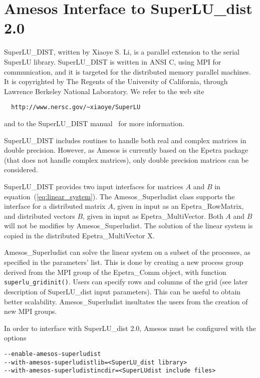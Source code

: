 \documentclass[11pt]{SANDreport}
\begin{document}

\section{Amesos Interface to SuperLU\_dist 2.0}
\label{sec:superludist}

SuperLU\_DIST, written by Xiaoye S. Li, is a parallel extension to the
serial SuperLU library.  SuperLU\_DIST is written in ANSI C, using MPI
for communication, and it is targeted for the distributed memory
parallel machines. It is copyrighted by The Regents of the University of
California, through Lawrence Berkeley National Laboratory.  We refer to
the web site
\begin{verbatim}
  http://www.nersc.gov/~xiaoye/SuperLU
\end{verbatim}
and to the SuperLU\_DIST manual~\cite{superlu-manual} for more
information.

SuperLU\_DIST includes routines to handle both real and complex matrices
in double precision. However, as Amesos is currently based on the Epetra
package (that does not handle complex matrices), only double precision
matrices can be considered.

SuperLU\_DIST provides two input interfaces for matrices $A$ and $B$ in
equation~(\ref{eq:linear_system}). The Amesos\_Superludist class
supports the interface for a distributed matrix $A$, given in input as
an Epetra\_RowMatrix, and distributed vectors $B$, given in input as
Epetra\_MultiVector. Both $A$ and $B$ will not be modifies by
Amesos\_Superludist. The solution of the linear system is copied in the
distributed Epetra\_MultiVector X.

Amesos\_Superludist can solve the linear system on a subset of the
processes, as specified in the parameters' list. This is done by
creating a new process group derived from the MPI group of the
Epetra\_Comm object, with function \verb!superlu_gridinit()!. Users can
specify rows and columns of the grid (see later description of
SuperLU\_dist input parameters). This can be useful to obtain better
scalability. Amesos\_Superludist insultates the users from the creation
of new MPI groups.

\medskip

In order to interface with SuperLU\_dist 2.0, Amesos must be configured with
the options
\begin{verbatim}
--enable-amesos-superludist 
--with-amesos-superludistlib=<SuperLU_dist library>
--with-amesos-superludistincdir=<SuperLUdist include files>
\end{verbatim}
\end{document}
